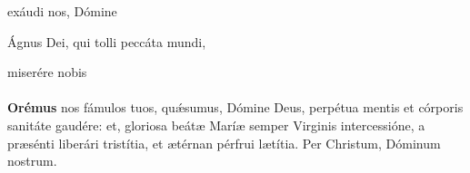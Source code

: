 {\hspace*{\fill}}exáudi nos, Dómine

Ágnus Dei, qui tolli peccáta mundi, 

{\hspace*{\fill}}miserére nobis\\[2mm]
\orapronobissalve\\

\textbf{Orémus}
nos fámulos tuos, qu{\'\ae}sumus, Dómine Deus, perpétua mentis et córporis sanitáte gaudére: et, gloriosa beát{\ae}
Marí{\ae} semper Virginis intercessióne, a pr{\ae}sénti liberári tristítia, et {\ae}térnan pérfrui l{\ae}títia. Per Christum, Dóminum nostrum.\\
